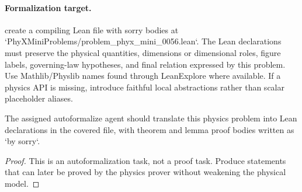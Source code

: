 \paragraph{Formalization target.}
create a compiling Lean file with sorry bodies at `PhyXMiniProblems/problem\_phyx\_mini\_0056.lean`. The Lean declarations must preserve the physical quantities, dimensions or dimensional roles, figure labels, governing-law hypotheses, and final relation expressed by this problem.
Use Mathlib/Physlib names found through LeanExplore where available. If a physics API is missing, introduce faithful local abstractions rather than scalar placeholder aliases.

\begin{theorem}
\label{thm:physics:phyx_mini_0056:target}
The assigned autoformalize agent should translate this physics problem into Lean declarations in the covered file, with theorem and lemma proof bodies written as `by sorry`.
\end{theorem}
\begin{proof}
This is an autoformalization task, not a proof task. Produce statements that can later be proved by the physics prover without weakening the physical model.
\end{proof}

